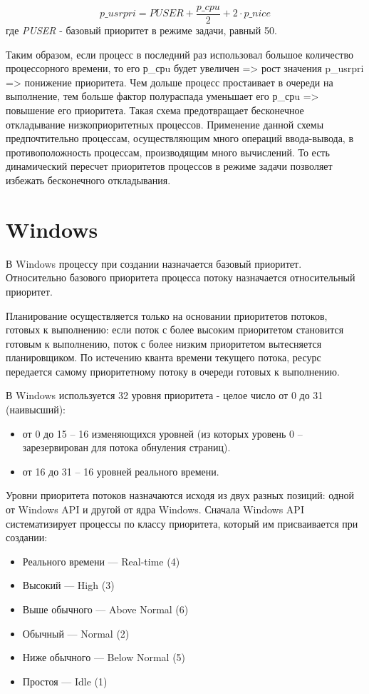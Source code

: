 \begin{equation}
\label{eq:ref2}
p\_usrpri = PUSER + \frac{p\_cpu}{2} + 2 \cdot p\_nice
\end{equation}где \textit{PUSER} - базовый приоритет в режиме задачи, равный 50.

Таким образом, если процесс в последний раз использовал большое количество процессорного времени, то его р\_срu будет увеличен => рост значения p\_usrpri => понижение приоритета.  Чем дольше процесс простаивает в очереди на выполнение, тем больше фактор полураспада уменьшает его р\_срu => повышение его приоритета. Такая схема предотвращает бесконечное откладывание низкоприоритетных процессов. Применение данной схемы предпочтительно процессам, осуществляющим много операций ввода-вывода, в противоположность процессам, производящим много вычислений. То есть динамический пересчет приоритетов процессов в режиме задачи позволяет избежать бесконечного откладывания.


\section{Windows}

В Windows процессу при создании назначается базовый приоритет. Относительно базового приоритета процесса потоку назначается относительный приоритет.

Планирование осуществляется только на основании приоритетов потоков, готовых к выполнению: если поток с более высоким приоритетом становится готовым к выполнению, поток с более низким приоритетом вытесняется планировщиком. По истечению кванта времени текущего потока, ресурс передается самому приоритетному потоку в очереди готовых к выполнению.

В Windows используется 32 уровня приоритета - целое число от 0 до 31 (наивысший):
\begin{itemize}
	\item от 0 до 15 -- 16 изменяющихся уровней (из которых уровень 0 -- зарезервирован для потока обнуления страниц).
	\item от 16 до 31 -- 16 уровней реального времени.
\end{itemize}

Уровни приоритета потоков назначаются исходя из двух разных позиций: одной от Windows API и другой от ядра Windows. Сначала Windows API систематизирует процессы по классу приоритета, который им присваивается при создании:
\begin{itemize}
	\item Реального времени — Real-time (4)
	\item Высокий — High (3)
	\item Выше обычного — Above Normal (6)
	\item Обычный — Normal (2)
	\item Ниже обычного — Below Normal (5)
	\item Простоя — Idle (1)
\end{itemize}

